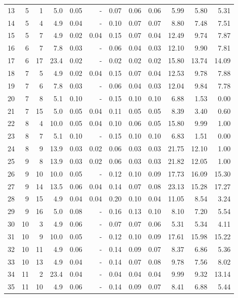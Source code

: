 \begin{small}
\begin{longtable}[c]{lrrrrr|rrr|rrr}
13 & 5 & 1 & 5.0 & 0.05 & - & 0.07 & 0.06 & 0.06 & 5.99 & 5.80 & 5.31 \\
14 & 5 & 4 & 4.9 & 0.04 & - & 0.10 & 0.07 & 0.07 & 8.80 & 7.48 & 7.51 \\
15 & 5 & 7 & 4.9 & 0.02 & 0.04 & 0.15 & 0.07 & 0.04 & 12.49 & 9.74 & 7.87 \\
16 & 6 & 7 & 7.8 & 0.03 & - & 0.06 & 0.04 & 0.03 & 12.10 & 9.90 & 7.81 \\
17 & 6 & 17 & 23.4 & 0.02 & - & 0.02 & 0.02 & 0.02 & 15.80 & 13.74 & 14.09 \\
18 & 7 & 5 & 4.9 & 0.02 & 0.04 & 0.15 & 0.07 & 0.04 & 12.53 & 9.78 & 7.88 \\
19 & 7 & 6 & 7.8 & 0.03 & - & 0.06 & 0.04 & 0.03 & 12.04 & 9.84 & 7.78 \\
20 & 7 & 8 & 5.1 & 0.10 & - & 0.15 & 0.10 & 0.10 & 6.88 & 1.53 & 0.00 \\
21 & 7 & 15 & 5.0 & 0.05 & 0.04 & 0.11 & 0.05 & 0.05 & 8.39 & 3.40 & 0.60 \\
22 & 8 & 4 & 10.0 & 0.05 & 0.04 & 0.10 & 0.06 & 0.05 & 15.80 & 9.99 & 1.00 \\
23 & 8 & 7 & 5.1 & 0.10 & - & 0.15 & 0.10 & 0.10 & 6.83 & 1.51 & 0.00 \\
24 & 8 & 9 & 13.9 & 0.03 & 0.02 & 0.06 & 0.03 & 0.03 & 21.75 & 12.10 & 1.00 \\
25 & 9 & 8 & 13.9 & 0.03 & 0.02 & 0.06 & 0.03 & 0.03 & 21.82 & 12.05 & 1.00 \\
26 & 9 & 10 & 10.0 & 0.05 & - & 0.12 & 0.10 & 0.09 & 17.73 & 16.09 & 15.30 \\
27 & 9 & 14 & 13.5 & 0.06 & 0.04 & 0.14 & 0.07 & 0.08 & 23.13 & 15.28 & 17.27 \\
28 & 9 & 15 & 4.9 & 0.04 & 0.04 & 0.20 & 0.10 & 0.04 & 11.05 & 8.54 & 3.24 \\
29 & 9 & 16 & 5.0 & 0.08 & - & 0.16 & 0.13 & 0.10 & 8.10 & 7.20 & 5.54 \\
30 & 10 & 3 & 4.9 & 0.06 & - & 0.07 & 0.07 & 0.06 & 5.31 & 5.34 & 4.11 \\
31 & 10 & 9 & 10.0 & 0.05 & - & 0.12 & 0.10 & 0.09 & 17.61 & 15.98 & 15.22 \\
32 & 10 & 11 & 4.9 & 0.06 & - & 0.14 & 0.09 & 0.07 & 8.37 & 6.86 & 5.36 \\
33 & 10 & 13 & 4.9 & 0.04 & - & 0.14 & 0.07 & 0.08 & 9.78 & 7.56 & 8.02 \\
34 & 11 & 2 & 23.4 & 0.04 & - & 0.04 & 0.04 & 0.04 & 9.99 & 9.32 & 13.14 \\
35 & 11 & 10 & 4.9 & 0.06 & - & 0.14 & 0.09 & 0.07 & 8.41 & 6.88 & 5.44 \\

\end{longtable}
\end{small}
